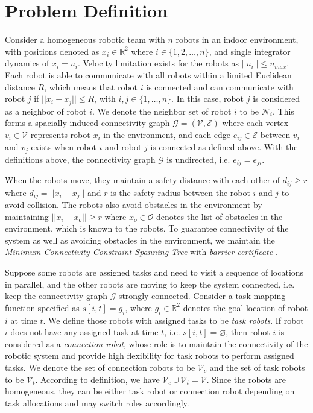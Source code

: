 \documentclass[../main.tex]{subfiles}
\begin{document}
\section{Problem Definition} \label{sec:definition}
Consider a homogeneous robotic team with $n$ robots in an indoor environment, with positions denoted as $x_i \in \mathbb{R}^2$ where $i \in \{1, 2, \ldots, n\}$, and single integrator dynamics of $\dot x_i = u_i$. Velocity limitation exists for the robots as $||u_i|| \leq u_{max}$. Each robot is able to communicate with all robots within a limited Euclidean distance $R$, which means that robot $i$ is connected and can communicate with robot $j$ if $||x_i - x_j|| \leq R$, with $i, j \in \{1, \ldots, n\}$. In this case, robot $j$ is considered as a neighbor of robot $i$. We denote the neighbor set of robot $i$ to be $\mathcal{N}_i$. This forms a spacially induced connectivity graph $\mathcal{G} = (\mathcal{V}, \mathcal{E})$ where each vertex $v_i \in \mathcal{V}$ represents robot $x_i$ in the environment, and each edge $e_{ij} \in \mathcal{E}$ between $v_i$ and $v_j$ exists when robot $i$ and robot $j$ is connected as defined above. With the definitions above, the connectivity graph $\mathcal{G}$ is undirected, i.e. $e_{ij} = e_{ji}$.

When the robots move, they maintain a safety distance with each other of $d_{ij} \geq r$ where $d_{ij} = ||x_i - x_j||$ and $r$ is the safety radius between the robot $i$ and $j$ to avoid collision. The robots also avoid obstacles in the environment by maintaining $||x_i - x_o|| \geq r$ where $x_o \in \mathcal{O}$ denotes the list of obstacles in the environment, which is known to the robots. To guarantee connectivity of the system as well as avoiding obstacles in the environment, we maintain the \textit{Minimum Connectivity Constraint Spanning Tree} \cite{luo2019behavior} with \textit{barrier certificate} \cite{borrmann2015control}.

Suppose some robots are assigned tasks and need to visit a sequence of locations in parallel, and the other robots are moving to keep the system connected, i.e. keep the connectivity graph $\mathcal{G}$ strongly connected. Consider a task mapping function specified as $s[i, t] = g_i$, where  $g_i \in \mathbb{R}^2$ denotes the goal location of robot $i$ at time $t$. We define those robots with assigned tasks to be \textit{task robots}. If robot $i$ does not have any assigned task at time $t$, i.e. $s[i, t] = \varnothing$, then robot $i$ is considered as a \textit{connection robot}, whose role is to maintain the connectivity of the robotic system and provide high flexibility for task robots to perform assigned tasks. We denote the set of connection robots to be $\mathcal{V}_c$ and the set of task robots to be $\mathcal{V}_t$. According to definition, we have $\mathcal{V}_c \cup \mathcal{V}_t = \mathcal{V}$. Since the robots are homogeneous, they can be either task robot or connection robot depending on task allocations and may switch roles accordingly.
\end{document}
